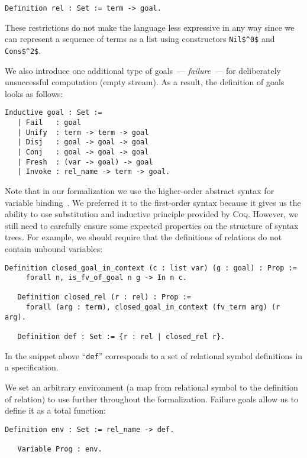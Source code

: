 \begin{lstlisting}[language=Coq]
   Definition rel : Set := term -> goal.
\end{lstlisting}

These restrictions do not make the language less expressive in any way since we can represent a sequence of terms as a list using constructors \lstinline|Nil$^0$| and \lstinline|Cons$^2$|.

We also introduce one additional type of goals~--- \emph{failure}~--- for deliberately unsuccessful computation (empty stream). As a result, the definition of goals looks as follows:

\begin{lstlisting}[language=Coq]
   Inductive goal : Set :=
   | Fail   : goal
   | Unify  : term -> term -> goal
   | Disj   : goal -> goal -> goal
   | Conj   : goal -> goal -> goal
   | Fresh  : (var -> goal) -> goal
   | Invoke : rel_name -> term -> goal.
\end{lstlisting}

Note that in our formalization we use the higher-order abstract syntax for variable binding~\cite{HOAS}. We preferred it to the first-order syntax because it gives us the ability
to use substitution and inductive principle provided by \textsc{Coq}. However, we still need to carefully ensure some expected properties on the structure of syntax trees.
For example, we should require that the definitions of relations do not contain unbound variables:

\begin{lstlisting}[language=Coq]
   Definition closed_goal_in_context (c : list var) (g : goal) : Prop :=
     forall n, is_fv_of_goal n g -> In n c.

   Definition closed_rel (r : rel) : Prop :=
     forall (arg : term), closed_goal_in_context (fv_term arg) (r arg).
 
   Definition def : Set := {r : rel | closed_rel r}.
\end{lstlisting}

In the snippet above ``\lstinline[language=Coq]{def}'' corresponds to a set of relational symbol definitions in a specification.

We set an arbitrary environment (a map from relational symbol to the definition of relation) to use further throughout the formalization. Failure goals allow us to define it as
a total function:

\begin{lstlisting}[language=Coq]
   Definition env : Set := rel_name -> def.

   Variable Prog : env.
\end{lstlisting}

